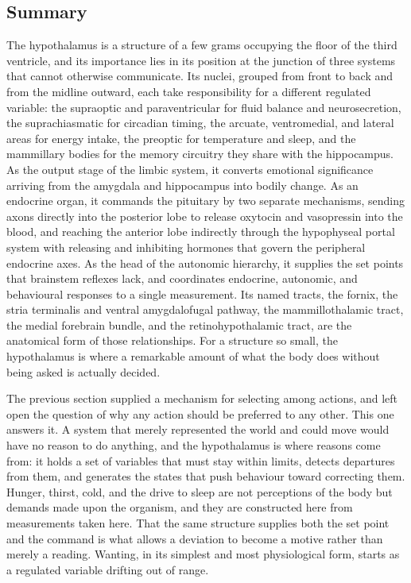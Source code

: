 \documentclass[11pt]{article}
\begin{document}
\subsection{Summary}

The hypothalamus is a structure of a few grams occupying the floor of the third ventricle, and its importance lies in its position at the junction of three systems that cannot otherwise communicate. Its nuclei, grouped from front to back and from the midline outward, each take responsibility for a different regulated variable: the supraoptic and paraventricular for fluid balance and neurosecretion, the suprachiasmatic for circadian timing, the arcuate, ventromedial, and lateral areas for energy intake, the preoptic for temperature and sleep, and the mammillary bodies for the memory circuitry they share with the hippocampus. As the output stage of the limbic system, it converts emotional significance arriving from the amygdala and hippocampus into bodily change. As an endocrine organ, it commands the pituitary by two separate mechanisms, sending axons directly into the posterior lobe to release oxytocin and vasopressin into the blood, and reaching the anterior lobe indirectly through the hypophyseal portal system with releasing and inhibiting hormones that govern the peripheral endocrine axes. As the head of the autonomic hierarchy, it supplies the set points that brainstem reflexes lack, and coordinates endocrine, autonomic, and behavioural responses to a single measurement. Its named tracts, the fornix, the stria terminalis and ventral amygdalofugal pathway, the mammillothalamic tract, the medial forebrain bundle, and the retinohypothalamic tract, are the anatomical form of those relationships. For a structure so small, the hypothalamus is where a remarkable amount of what the body does without being asked is actually decided.

The previous section supplied a mechanism for selecting among actions, and left open the question of why any action should be preferred to any other. This one answers it. A system that merely represented the world and could move would have no reason to do anything, and the hypothalamus is where reasons come from: it holds a set of variables that must stay within limits, detects departures from them, and generates the states that push behaviour toward correcting them. Hunger, thirst, cold, and the drive to sleep are not perceptions of the body but demands made upon the organism, and they are constructed here from measurements taken here. That the same structure supplies both the set point and the command is what allows a deviation to become a motive rather than merely a reading. Wanting, in its simplest and most physiological form, starts as a regulated variable drifting out of range.
\end{document}
